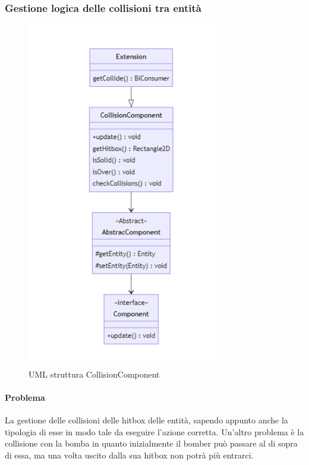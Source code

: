 \documentclass[a4paper,12pt]{report}
\begin{document}
\subsubsection{Gestione logica delle collisioni tra entità}

\begin{figure}[H]
    \centering{}
    \includegraphics[width=0.75\textwidth]{img/UMLCollisioni.png}
    \caption{UML struttura CollisionComponent}
\end{figure}

\paragraph{Problema}  La gestione delle collisioni delle hitbox delle entità, sapendo appunto anche la tipologia di esse in modo tale da eseguire l’azione corretta. Un’altro problema è la collisione con la bomba in quanto inizialmente il bomber può passare al di sopra di essa, ma una volta uscito dalla sua hitbox non potrà più entrarci.
\end{document}
